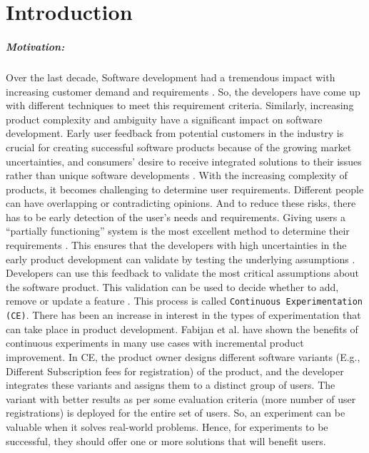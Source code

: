 \chapter{Introduction} \label{chap:intro}

\paragraph{Motivation:}
Over the last decade, Software development had a tremendous impact with increasing customer demand and requirements \cite{article:swdemand:ahmed}. 
So, the developers have come up with different techniques to meet this requirement criteria. 
Similarly, increasing product complexity and ambiguity have a significant impact on software development. 
Early user feedback from potential customers in the industry is crucial for creating successful software products because of the growing market uncertainties, and consumers' desire to receive integrated solutions to their issues rather than unique software developments \cite{misc:businessmodels:teece}.
With the increasing complexity of products, it becomes challenging to determine user requirements.
Different people can have overlapping or contradicting opinions. 
And to reduce these risks, there has to be early detection of the user's needs and requirements. 
Giving users a ``partially functioning'' system is the most excellent method to determine their requirements \cite{journal:prototyping:davis}.
This ensures that the developers with high uncertainties in the early product development can validate by testing the underlying assumptions \cite{misc:lean:steve}.
Developers can use this feedback to validate the most critical assumptions about the software product. 
This validation can be used to decide whether to add, remove or update a feature \cite{article:experiments:lindgren}. 
This process is called \texttt{Continuous Experimentation (CE)}.
There has been an increase in interest in the types of experimentation that can take place in product development. 
Fabijan et al. \cite{article:controlled:experiements} have shown the benefits of continuous experiments in many use cases with incremental product improvement. 
In CE, the product owner designs different software variants (E.g., Different Subscription fees for registration) of the product, and the developer integrates these variants and assigns them to a distinct group of users. The variant with better results as per some evaluation criteria (more number of user registrations) is deployed for the entire set of users.
So, an experiment can be valuable when it solves real-world problems.
Hence, for experiments to be successful, they should offer one or more solutions that will benefit users.

